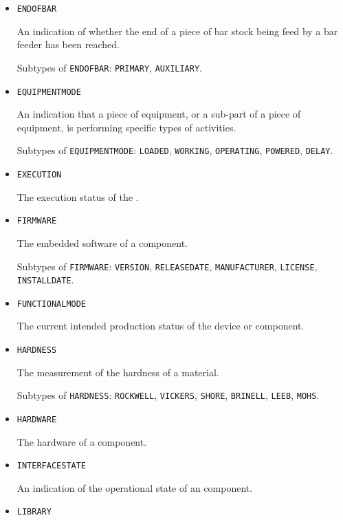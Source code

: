 \begin{itemize}
\item \texttt{END\textunderscore OF\textunderscore BAR}  

An indication of whether the end of a piece of bar stock being feed by a bar feeder has been reached.

Subtypes of \texttt{END\textunderscore OF\textunderscore BAR}: \texttt{PRIMARY}, \texttt{AUXILIARY}.

\item \texttt{EQUIPMENT\textunderscore MODE}  

An indication that a piece of equipment, or a sub-part of a piece of equipment, is performing specific types of activities.

Subtypes of \texttt{EQUIPMENT\textunderscore MODE}: \texttt{LOADED}, \texttt{WORKING}, \texttt{OPERATING}, \texttt{POWERED}, \texttt{DELAY}.

\item \texttt{EXECUTION}  

The execution status of the .


\item \texttt{FIRMWARE}  

The embedded software of a component.


Subtypes of \texttt{FIRMWARE}: \texttt{VERSION}, \texttt{RELEASE\textunderscore DATE}, \texttt{MANUFACTURER}, \texttt{LICENSE}, \texttt{INSTALL\textunderscore DATE}.

\item \texttt{FUNCTIONAL\textunderscore MODE}  

The current intended production status of the device or component.


\item \texttt{HARDNESS}  

The measurement of the hardness of a material.

Subtypes of \texttt{HARDNESS}: \texttt{ROCKWELL}, \texttt{VICKERS}, \texttt{SHORE}, \texttt{BRINELL}, \texttt{LEEB}, \texttt{MOHS}.

\item \texttt{HARDWARE}  

The hardware of a component.



\item \texttt{INTERFACE\textunderscore STATE}  

An indication of the operational state of an  component.


\item \texttt{LIBRARY}  


\end{itemize}

